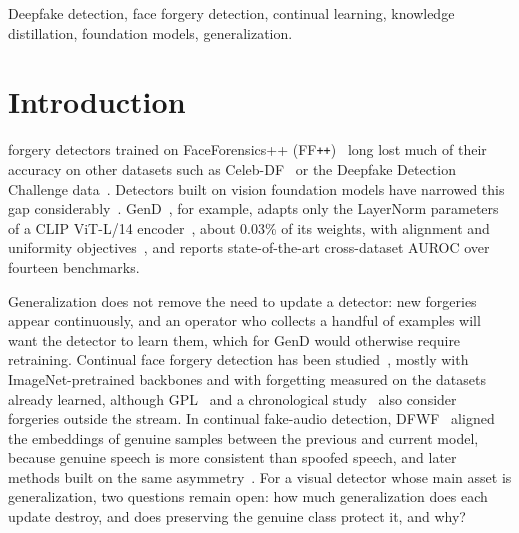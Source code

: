 \documentclass[journal]{IEEEtran}
\newcommand{\ffpp}{FF\texttt{++}}
\begin{document}
\begin{IEEEkeywords}
Deepfake detection, face forgery detection, continual learning, knowledge distillation, foundation models, generalization.
\end{IEEEkeywords}

\section{Introduction}

 forgery detectors trained on FaceForensics++ (\ffpp{})~\cite{rossler2019faceforensics} long lost much of their accuracy on other datasets such as Celeb-DF~\cite{li2020celebdf} or the Deepfake Detection Challenge data~\cite{dolhansky2019dfdcpreview}. Detectors built on vision foundation models have narrowed this gap considerably~\cite{cui2025forensicsadapter,yan2025effort,han2025fcg}. GenD~\cite{yermakov2026gend}, for example, adapts only the LayerNorm parameters of a CLIP ViT-L/14 encoder~\cite{radford2021clip}, about 0.03\% of its weights, with alignment and uniformity objectives~\cite{wang2020alignuniform}, and reports state-of-the-art cross-dataset AUROC over fourteen benchmarks.

Generalization does not remove the need to update a detector: new forgeries appear continuously, and an operator who collects a handful of examples will want the detector to learn them, which for GenD would otherwise require retraining. Continual face forgery detection has been studied~\cite{kim2021cored,pan2023dfil,sun2023hdp,cheng2025surlid,zhang2025gpl,laiti2024prompt2guard}, mostly with ImageNet-pretrained backbones and with forgetting measured on the datasets already learned, although GPL~\cite{zhang2025gpl} and a chronological study~\cite{fontana2025chronological} also consider forgeries outside the stream. In continual fake-audio detection, DFWF~\cite{ma2021dfwf} aligned the embeddings of genuine samples between the previous and current model, because genuine speech is more consistent than spoofed speech, and later methods built on the same asymmetry~\cite{zhang2023rawm,zhang2024rwm}. For a visual detector whose main asset is generalization, two questions remain open: how much generalization does each update destroy, and does preserving the genuine class protect it, and why?
\end{document}
